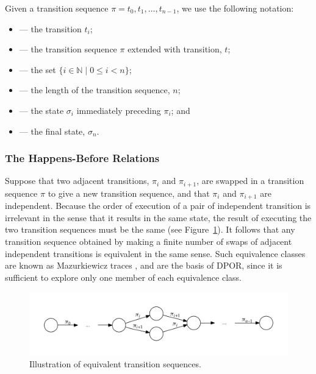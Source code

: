 \documentclass[12pt,a4paper,twoside,openright]{report}
\begin{document}
Given a transition sequence $\pi = t_0, t_1, \ldots, t_{n-1}$,
we use the following notation:
\begin{itemize}[label={}]
	\newcommand{\defsindent}{3.5em}
	\item{\makebox[\defsindent]{\hfill$\pi_i$}
		--- the transition $t_i$;}
	\item{\makebox[\defsindent]{\hfill$\pi.t$}
		--- the transition sequence $\pi$ extended with
		transition, $t$;}
	\item{\makebox[\defsindent]{\hfill$\textit{dom}(\pi)$}
		--- the set $\{i \in \mathbb{N} \mid 0 \leq i < n \}$;}
	\item{\makebox[\defsindent]{\hfill$|\pi|$}
		--- the length of the transition sequence, $n$;}
	\item{\makebox[\defsindent]{\hfill$\textit{pre}(\pi, i)$}
		--- the state $\sigma_i$ immediately preceding $\pi_i$; and}
	\item{\makebox[\defsindent]{\hfill$\textit{last}(\pi)$}
		--- the final state, $\sigma_n$.}
\end{itemize}

\subsubsection{The Happens-Before Relations}\label{sec:happens-before}

Suppose that two adjacent transitions, $\pi_i$ and $\pi_{i+1}$,
are swapped in a
transition sequence $\pi$ to give a new
transition sequence, and that
$\pi_i$ and $\pi_{i+1}$ are independent.
Because the order of execution of a
pair of independent transition is
irrelevant in the sense that it
results in the same state, the result
of executing the two transition
sequences must be the same
(see Figure~\ref{fig:sequence-equivalence}).
It follows that any transition sequence obtained
by making a finite number of swaps of adjacent
independent transitions is equivalent in the same
sense. Such equivalence classes are known as
Mazurkiewicz traces \cite{maz87}, and are
the basis of DPOR, since it is
sufficient to explore only one member of
each equivalence class.

\begin{figure}
	\centering
	\includegraphics[width=\textwidth]{seqequiv}
	\caption{Illustration of equivalent transition sequences.}
	\label{fig:sequence-equivalence}
\end{figure}
\end{document}
